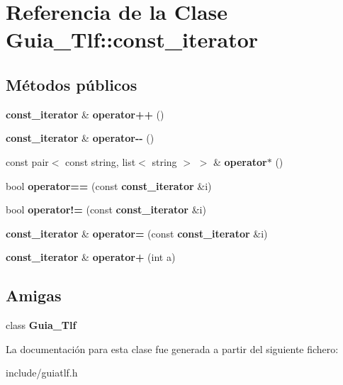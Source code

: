 \section{Referencia de la Clase Guia\+\_\+\+Tlf\+:\+:const\+\_\+iterator}
\label{classGuia__Tlf_1_1const__iterator}
\subsection*{Métodos públicos}
\begin{DoxyCompactItemize}
\item 
{\bf const\+\_\+iterator} \& {\bfseries operator++} ()\label{classGuia__Tlf_1_1const__iterator_adeb2b592fd9f66095d4586555758b05d}

\item 
{\bf const\+\_\+iterator} \& {\bfseries operator-\/-\/} ()\label{classGuia__Tlf_1_1const__iterator_a66384372c565c771758da1e973f9dffd}

\item 
const pair$<$ const string, list$<$ string $>$ $>$ \& {\bfseries operator$\ast$} ()\label{classGuia__Tlf_1_1const__iterator_a569a65eba553adde3768930ffa4e4e3c}

\item 
bool {\bfseries operator==} (const {\bf const\+\_\+iterator} \&i)\label{classGuia__Tlf_1_1const__iterator_af2c948674f4516d534e37535cc874a78}

\item 
bool {\bfseries operator!=} (const {\bf const\+\_\+iterator} \&i)\label{classGuia__Tlf_1_1const__iterator_afdbd3cd0cb596196c6002b4b9b672453}

\item 
{\bf const\+\_\+iterator} \& {\bfseries operator=} (const {\bf const\+\_\+iterator} \&i)\label{classGuia__Tlf_1_1const__iterator_a60509fbd78a2dddcaaba8477c27da93f}

\item 
{\bf const\+\_\+iterator} \& {\bfseries operator+} (int a)\label{classGuia__Tlf_1_1const__iterator_aea36607af57cbf11184b178cdc6c7ae9}

\end{DoxyCompactItemize}
\subsection*{Amigas}
\begin{DoxyCompactItemize}
\item 
class {\bfseries Guia\+\_\+\+Tlf}\label{classGuia__Tlf_1_1const__iterator_a4349d7a1b26a0aa94447235f95b2f940}

\end{DoxyCompactItemize}


La documentación para esta clase fue generada a partir del siguiente fichero\+:\begin{DoxyCompactItemize}
\item 
include/guiatlf.\+h\end{DoxyCompactItemize}
